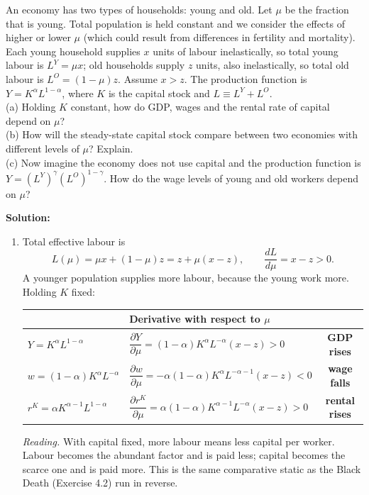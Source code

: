 \documentclass[12pt, letterpaper]{article}
\newcommand{\pd}[2]{\dfrac{\partial #1}{\partial #2}}
\newcommand{\dd}[2]{\dfrac{d #1}{d #2}}
\begin{document}
\begin{tcolorbox}[oddbox,title={Problem 9.7 \quad Getting Old}]
\begin{tcolorbox}[questionbox]
An economy has two types of households: young and old. Let $\mu$ be the fraction that is
young. Total population is held constant and we consider the effects of higher or lower
$\mu$ (which could result from differences in fertility and mortality). Each young household
supplies $x$ units of labour inelastically, so total young labour is $L^Y=\mu x$; old
households supply $z$ units, also inelastically, so total old labour is $L^O=(1-\mu)z$.
Assume $x>z$. The production function is $Y=K^\alpha L^{1-\alpha}$, where $K$ is the capital
stock and $L\equiv L^Y+L^O$.\\[3pt]
(a) Holding $K$ constant, how do GDP, wages and the rental rate of capital depend on
$\mu$?\\
(b) How will the steady-state capital stock compare between two economies with different
levels of $\mu$? Explain.\\
(c) Now imagine the economy does not use capital and the production function is
$Y=(L^Y)^\gamma (L^O)^{1-\gamma}$. How do the wage levels of young and old workers depend on
$\mu$?
\end{tcolorbox}

\textbf{Solution:}

\begin{enumerate}
\item Total effective labour is
\[
L(\mu)=\mu x+(1-\mu)z=z+\mu(x-z),\qquad \dd{L}{\mu}=x-z>0 .
\]
A younger population supplies more labour, because the young work more. Holding $K$ fixed:
\begin{center}
\renewcommand{\arraystretch}{2.0}
\begin{tabular}{@{}llc@{}}
\toprule
& \textbf{Derivative with respect to $\mu$} & \\
\midrule
$Y=K^\alpha L^{1-\alpha}$
  & $\pd{Y}{\mu}=(1-\alpha)K^\alpha L^{-\alpha}(x-z)>0$ & \textbf{GDP rises} \\
$w=(1-\alpha)K^{\alpha}L^{-\alpha}$
  & $\pd{w}{\mu}=-\alpha(1-\alpha)K^\alpha L^{-\alpha-1}(x-z)<0$ & \textbf{wage falls} \\
$r^K=\alpha K^{\alpha-1}L^{1-\alpha}$
  & $\pd{r^K}{\mu}=\alpha(1-\alpha)K^{\alpha-1}L^{-\alpha}(x-z)>0$ & \textbf{rental rises} \\
\bottomrule
\end{tabular}
\end{center}
\emph{Reading.} With capital fixed, more labour means less capital per worker. Labour becomes
the abundant factor and is paid less; capital becomes the scarce one and is paid more. This
is the same comparative static as the Black Death (Exercise 4.2) run in reverse.


\end{enumerate}
\end{tcolorbox}
\end{document}
